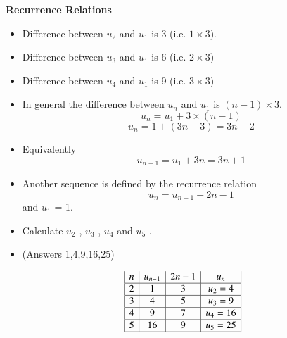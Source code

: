 \documentclass[12pt]{article}
\begin{document}

\noindent \textbf{Recurrence Relations}

\begin{itemize}
\item Difference between $u_2$ and $u_1$ is 3 (i.e. $1 \times 3$).
\item Difference between $u_3$ and $u_1$ is 6 (i.e. $2 \times 3$)
\item Difference between $u_4$ and $u_1$ is 9 (i.e. $3 \times 3$)
\item In general the difference between $u_n$ and $u_1$ is $(n-1)\times 3$.
\[ u_{n} = u_1 + 3 \times (n-1) \]
\[ u_{n} = 1 + (3n-3) = 3n-2\]
\item Equivalently
\[ u_{n+1} = u_1 + 3n = 3n+1\]
\end{itemize}

\begin{itemize}
\item Another sequence is defined by the recurrence relation 
\[ u_n = u_{n-1} + 2n-1 \] and
$u_1$ = 1.
\item Calculate $u_2$ , $u_3$ , $u_4$  and $u_5$ .
\item (Answers 1,4,9,16,25)
\end{itemize}

\[\begin{array}{|c|c|c|c|}
n    & u_{n-1} & 2n-1 & u_n \\ \hline
2      & 1         &  3   & u_2 = 4 \\ \hline
3      & 4         &  5   & u_3 = 9 \\ \hline
4      & 9         &  7   & u_4 = 16 \\ \hline
5      & 16        &  9   & u_5 = 25 \\ \hline
\end{array}\]
\end{document}
